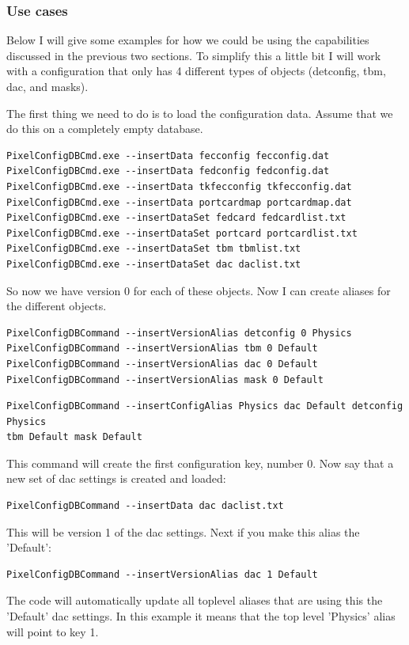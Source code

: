 \subsubsection{Use cases}

Below I will give some examples for how we could be using the
capabilities discussed in the previous two sections. To simplify
this a little bit I will work with a configuration that only
has 4 different types of objects (detconfig, tbm, dac, and masks).

The first thing we need to do is to load the configuration data.
Assume that we do this on a completely empty database.

\begin{verbatim}
PixelConfigDBCmd.exe --insertData fecconfig fecconfig.dat
PixelConfigDBCmd.exe --insertData fedconfig fedconfig.dat
PixelConfigDBCmd.exe --insertData tkfecconfig tkfecconfig.dat
PixelConfigDBCmd.exe --insertData portcardmap portcardmap.dat
PixelConfigDBCmd.exe --insertDataSet fedcard fedcardlist.txt
PixelConfigDBCmd.exe --insertDataSet portcard portcardlist.txt
PixelConfigDBCmd.exe --insertDataSet tbm tbmlist.txt
PixelConfigDBCmd.exe --insertDataSet dac daclist.txt
\end{verbatim}
So now we have version 0 for each of these objects. Now I can
create aliases for the different objects.

\begin{verbatim}
PixelConfigDBCommand --insertVersionAlias detconfig 0 Physics
PixelConfigDBCommand --insertVersionAlias tbm 0 Default
PixelConfigDBCommand --insertVersionAlias dac 0 Default
PixelConfigDBCommand --insertVersionAlias mask 0 Default
\end{verbatim}

\begin{verbatim}
PixelConfigDBCommand --insertConfigAlias Physics dac Default detconfig Physics
tbm Default mask Default
\end{verbatim}

This command will create the first configuration key, number 0. Now
say that a new set of dac settings is created and loaded:
\begin{verbatim}
PixelConfigDBCommand --insertData dac daclist.txt 
\end{verbatim}
This will be version 1 of the dac settings. Next if you make this
alias the 'Default':
\begin{verbatim}
PixelConfigDBCommand --insertVersionAlias dac 1 Default
\end{verbatim}
The code will automatically update all toplevel aliases that are
using this the 'Default' dac settings. In this example it
means that the top level 'Physics' alias will point to key 1.




